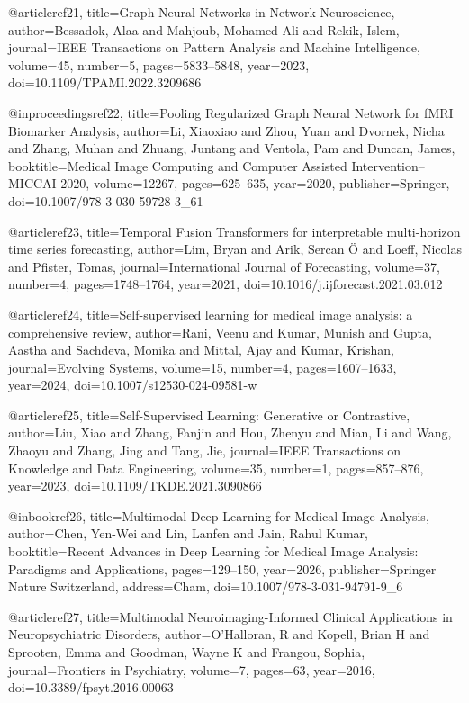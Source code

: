 @article{ref21,
  title={Graph Neural Networks in Network Neuroscience},
  author={Bessadok, Alaa and Mahjoub, Mohamed Ali and Rekik, Islem},
  journal={IEEE Transactions on Pattern Analysis and Machine Intelligence},
  volume={45},
  number={5},
  pages={5833--5848},
  year={2023},
  doi={10.1109/TPAMI.2022.3209686}
}

@inproceedings{ref22,
  title={Pooling Regularized Graph Neural Network for fMRI Biomarker Analysis},
  author={Li, Xiaoxiao and Zhou, Yuan and Dvornek, Nicha and Zhang, Muhan and Zhuang, Juntang and Ventola, Pam and Duncan, James},
  booktitle={Medical Image Computing and Computer Assisted Intervention--MICCAI 2020},
  volume={12267},
  pages={625--635},
  year={2020},
  publisher={Springer},
  doi={10.1007/978-3-030-59728-3_61}
}

@article{ref23,
  title={Temporal Fusion Transformers for interpretable multi-horizon time series forecasting},
  author={Lim, Bryan and Arik, Sercan Ö and Loeff, Nicolas and Pfister, Tomas},
  journal={International Journal of Forecasting},
  volume={37},
  number={4},
  pages={1748--1764},
  year={2021},
  doi={10.1016/j.ijforecast.2021.03.012}
}

@article{ref24,
  title={Self-supervised learning for medical image analysis: a comprehensive review},
  author={Rani, Veenu and Kumar, Munish and Gupta, Aastha and Sachdeva, Monika and Mittal, Ajay and Kumar, Krishan},
  journal={Evolving Systems},
  volume={15},
  number={4},
  pages={1607--1633},
  year={2024},
  doi={10.1007/s12530-024-09581-w}
}

@article{ref25,
  title={Self-Supervised Learning: Generative or Contrastive},
  author={Liu, Xiao and Zhang, Fanjin and Hou, Zhenyu and Mian, Li and Wang, Zhaoyu and Zhang, Jing and Tang, Jie},
  journal={IEEE Transactions on Knowledge and Data Engineering},
  volume={35},
  number={1},
  pages={857--876},
  year={2023},
  doi={10.1109/TKDE.2021.3090866}
}

@inbook{ref26,
  title={Multimodal Deep Learning for Medical Image Analysis},
  author={Chen, Yen-Wei and Lin, Lanfen and Jain, Rahul Kumar},
  booktitle={Recent Advances in Deep Learning for Medical Image Analysis: Paradigms and Applications},
  pages={129--150},
  year={2026},
  publisher={Springer Nature Switzerland},
  address={Cham},
  doi={10.1007/978-3-031-94791-9_6}
}

@article{ref27,
  title={Multimodal Neuroimaging-Informed Clinical Applications in Neuropsychiatric Disorders},
  author={O'Halloran, R and Kopell, Brian H and Sprooten, Emma and Goodman, Wayne K and Frangou, Sophia},
  journal={Frontiers in Psychiatry},
  volume={7},
  pages={63},
  year={2016},
  doi={10.3389/fpsyt.2016.00063}
}

